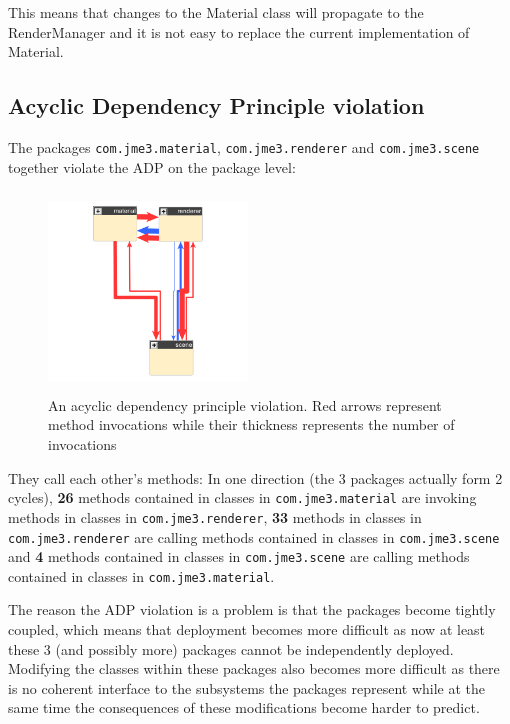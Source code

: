 \documentclass[a4paper, 10pt]{article}
\begin{document}
This means that changes to the Material class will propagate
to the RenderManager and it is not easy to replace the current
implementation of Material.

\vspace{45pt}

\subsection{Acyclic Dependency Principle violation}
\label{sec:adp_violation}

The packages \verb|com.jme3.material|, \verb|com.jme3.renderer| and
\verb|com.jme3.scene| together violate the ADP on the package level:

\begin{figure}
\includegraphics[width=200px, height=200px]{figures/adp-violation.png}
\caption{An acyclic dependency principle violation. Red arrows
  represent method invocations while their thickness represents the
  number of invocations}
\label{fig:adp-violation}
\end{figure}

They call each other's methods: In one direction (the 3 packages
actually form 2 cycles), \textbf{26} methods contained in classes in
\verb|com.jme3.material| are invoking methods in classes in
\verb|com.jme3.renderer|, \textbf{33} methods in classes in
\verb|com.jme3.renderer| are calling methods contained in classes in
\verb|com.jme3.scene| and \textbf{4} methods contained in classes in
\verb|com.jme3.scene| are calling methods contained in classes in
\verb|com.jme3.material|.

The reason the ADP violation is a problem is that the packages become
tightly coupled, which means that deployment becomes more difficult as
now at least these 3 (and possibly more) packages cannot be
independently deployed.
Modifying the classes within these packages also becomes more
difficult as there is no coherent interface to the subsystems the
packages represent while at the same time the consequences of these
modifications become harder to predict.\\
\end{document}
